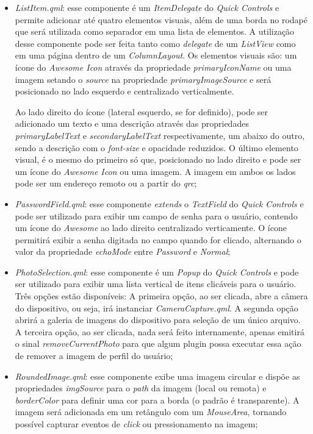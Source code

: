 \begin{itemize}
	\item \textit{ListItem.qml}: esse componente é um \textit{ItemDelegate} do \textit{Quick Controls} e permite adicionar até quatro elementos visuais, além de uma borda no rodapé que será utilizada como separador em uma lista de elementos. A utilização desse componente pode ser feita tanto como \textit{delegate} de um \textit{ListView} como em uma página dentro de um \textit{ColumnLayout}. Os elementos visuais são: um ícone do \textit{Awesome Icon} através da propriedade \textit{primaryIconName} ou uma imagem setando o \textit{source} na propriedade \textit{primaryImageSource} e será posicionado no lado esquerdo e centralizado verticalmente.\par
	Ao lado direito do ícone (lateral esquerdo, se for definido), pode ser adicionado um texto e uma descrição através das propriedades \textit{primaryLabelText} e \textit{secondaryLabelText} respectivamente, um abaixo do outro, sendo a descrição com o \textit{font-size} e opacidade reduzidos. O último elemento visual, é o mesmo do primeiro só que, posicionado no lado direito e pode ser um ícone do \textit{Awesome Icon} ou uma imagem. A imagem em ambos os lados pode ser um endereço remoto ou a partir do \textit{qrc};

	\item \textit{PasswordField.qml}: esse componente \textit{extends} o \textit{TextField} do \textit{Quick Controls} e pode ser utilizado para exibir um campo de senha para o usuário, contendo um ícone do \textit{Awesome} ao lado direito centralizado verticamente. O ícone permitirá exibir a senha digitada no campo quando for clicado, alternando o valor da propriedade \textit{echoMode} entre \textit{Password} e \textit{Normal};

	\item \textit{PhotoSelection.qml}: esse componente é um \textit{Popup} do \textit{Quick Controls} e pode ser utilizado para exibir uma lista vertical de itens clicáveis para o usuário. Três opções estão disponíveis: A primeira opção, ao ser clicada, abre a câmera do dispositivo, ou seja, irá instanciar \textit{CameraCapture.qml}. A segunda opção abrirá a galeria de imagens do dispositivo para seleção de um único arquivo. A terceira opção, ao ser clicada, nada será feito internamente, apenas emitirá o sinal \textit{removeCurrentPhoto} para que algum plugin possa executar essa ação de remover a imagem de perfil do usuário;

	\item \textit{RoundedImage.qml}: esse componente exibe uma imagem circular e dispõe as propriedades \textit{imgSource} para o \textit{path} da imagem (local ou remota) e \textit{borderColor} para definir uma cor para a borda (o padrão é transparente). A imagem será adicionada em um retângulo com um \textit{MouseArea}, tornando possível capturar eventos de \textit{click} ou pressionamento na imagem;


\end{itemize}
